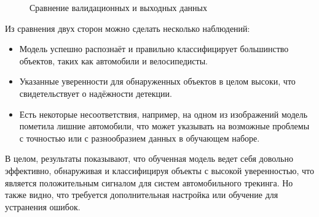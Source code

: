 \begin{figure}[htb]
    \centering
    \qquad
    \caption{Сравнение валидационных и выходных данных}%
    \label{fig::ResultsCompare}%
\end{figure}

Из сравнения двух сторон можно сделать несколько наблюдений:

\begin{itemize}

	\item Модель успешно распознаёт и правильно классифицирует большинство объектов, 
	таких как автомобили и велосипедисты.
	\item Указанные уверенности для обнаруженных объектов в целом высоки, что 
	свидетельствует о надёжности детекции.
	\item Есть некоторые несоответствия, например, на одном из изображений модель 
	пометила лишние автомобили, что может указывать на возможные проблемы с точностью
	или с разнообразием данных в обучающем наборе.

\end{itemize}

В целом, результаты показывают, что обученная модель ведет себя довольно эффективно, 
обнаруживая и классифицируя объекты с высокой уверенностью, что является положительным
сигналом для систем автомобильного трекинга. Но также видно, что требуется дополнительная
настройка или обучение для устранения ошибок.